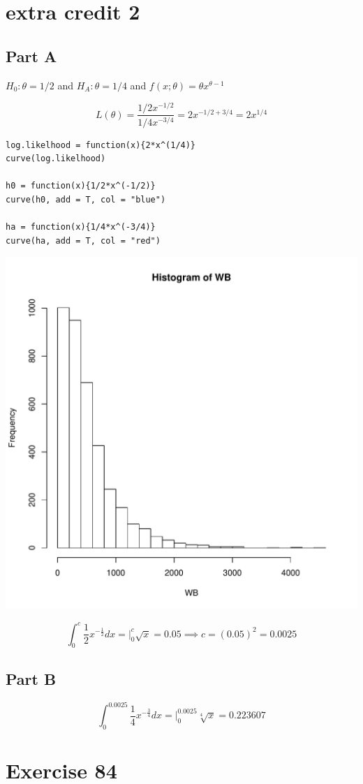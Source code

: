 \documentclass{article}\usepackage[]{graphicx}\usepackage[]{color}
\makeatletter
\newenvironment{kframe}{%
 \def\at@end@of@kframe{}%
 \ifinner\ifhmode%
  \def\at@end@of@kframe{\end{minipage}}%
  \begin{minipage}{\columnwidth}%
 \fi\fi%
 \def\FrameCommand##1{\hskip\@totalleftmargin \hskip-\fboxsep
 \colorbox{shadecolor}{##1}\hskip-\fboxsep
     \hskip-\linewidth \hskip-\@totalleftmargin \hskip\columnwidth}%
 \MakeFramed {\advance\hsize-\width
   \@totalleftmargin\z@ \linewidth\hsize
   \@setminipage}}%
 {\par\unskip\endMakeFramed%
 \at@end@of@kframe}
\newenvironment{knitrout}{}{} %
\makeatother
\begin{document}
\section*{extra credit 2}
\subsection*{Part A}
$H_{0}:\theta=1/2$ and $H_{A}:\theta=1/4$ and $f(x;\theta)=\theta x^{\theta-1}$

\begin{equation}
  L(\theta)=\frac{1/2x^{-1/2}}{1/4x^{-3/4}}=2x^{-1/2+3/4}=2x^{1/4}
 \end{equation}

\begin{knitrout}
\color{fgcolor}\begin{kframe}
\begin{verbatim}
log.likelhood = function(x){2*x^(1/4)}
curve(log.likelhood)

h0 = function(x){1/2*x^(-1/2)}
curve(h0, add = T, col = "blue")

ha = function(x){1/4*x^(-3/4)}
curve(ha, add = T, col = "red")
\end{verbatim}
\end{kframe}
\includegraphics[width=0.33\linewidth]{figure/unnamed-chunk-5-1} 

\end{knitrout}
\begin{equation}
\int_{0}^{c}\frac{1}{2}x^{-\frac{1}{2}}dx=\Big|_{0}^{c}\sqrt{x}=0.05\implies c=(0.05)^{2}=0.0025
\end{equation}
\subsection*{Part B}
\begin{equation}
\int_{0}^{0.0025}\frac{1}{4}x^{-\frac{3}{4}}dx=\Big|_{0}^{0.0025}\sqrt[4]{x}=0.223607
\end{equation}
\section*{Exercise 84}
\end{document}

